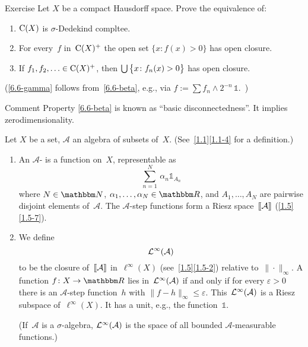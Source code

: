 \documentclass[main.tex]{subfiles}
\begin{document}
\begin{psec}{6.6}{Exercise}
Let $X$ be a compact Hausdorff space.
Prove the equivalence of:
\begin{enumerate}[label=(\greek{*})]
\item\label{6.6-alpha}
$\mathrm{C}(X)$ is $\sigma$-Dedekind compltee.
%
\item\label{6.6-beta}
For every~$f$ in~$\mathrm{C}(X)^+$ the open set $\{x\colon f(x)>0\}$
has open closure.
%
\item\label{6.6-gamma}
If $f_1,f_2,\dotsc\in\mathrm{C}(X)^+$,
then $\bigcup\smash{\bigl\{x\colon f_n(x)>0\bigr\}}$ has open closure.
\end{enumerate}

(\ref{6.6-gamma} follows from~\ref{6.6-beta},
e.g., via $f:=\sum f_n\wedge 2^{-n} \, \mathbb{1}$.\ )
\end{psec}
\begin{psec*}{Comment}
Property \ref{6.6-beta} 
is known as ``basic disconnectedness''.
It implies zerodimensionality.
\end{psec*}
%
%
\begin{psec}{6.7}%
Let $X$ be a set, $\mathcal A$ an algebra of subsets of~$X$.
(See~\ref{1.1}\ref{1.1-4} for a definition.)
\begin{enumerate}
\item\label{6.7-1}
An $\mathcal A$-
is a function on~$X$,
representable as
\begin{equation*}
\sum_{n=1}^N \,\alpha_n \mathbb{1}_{A_n}
\end{equation*}
where $N\in\N$, $\alpha_1,\dotsc,\alpha_N\in\R$,
and $A_1,\dotsc,A_N$
are pairwise disjoint elements of~$\mathcal A$.
The $\mathcal A$-step functions form a Riesz space~$\lbb \mathcal A \rbb$
(\ref{1.5}\ref{1.5-7}).
%
\item\label{6.7-2}
We define
\begin{equation*}
\mathcal{L}^\infty(\mathcal{A})
\end{equation*}
to be the closure of~$\lbb\mathcal A\rbb$ in~$\ell^\infty(X)$
(see~\ref{1.5}\ref{1.5-2}) relative to~$\|\cdot\|_\infty$.
A function $f\colon X\ra\R$ lies in~$\mathcal{L}^\infty(\mathcal A)$
if and only if for every $\varepsilon>0$
there is an $\mathcal A$-step function~$h$
with $\|f-h\|_\infty\leq\varepsilon$.
This~$\mathcal{L}^\infty(\mathcal A)$ is a Riesz subspace of~$\ell^\infty(X)$.
It has a unit, e.g., the function~$\mathbb{1}$.

(If~$\mathcal A$ is a $\sigma$-algebra,
$\mathcal{L}^\infty(\mathcal A)$ is the space of
all bounded $\mathcal A$-measurable functions.)
\end{enumerate}
\end{psec}
\end{document}

